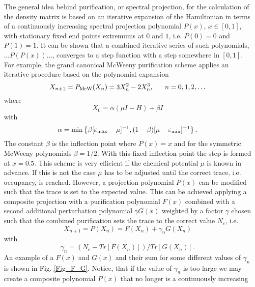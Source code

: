 The general idea behind purification, or spectral projection, for the calculation
of the density matrix is based on an iterative expansion of the
Hamiltonian in terms of a continuously increasing spectral projection 
polynomial $P(x)$, $x \in [0,1]$,
with stationary fixed end points extremums at $0$ and $1$, 
i.e. $P(0) = 0$ and $P(1) = 1$. 
It can be shown that a combined iterative series of such polynomials, 
$\ldots P(P(x)) \ldots$,  
converges to a step function with a step somewhere in $[0,1]$. 
For example, the grand canonical McWeeny purification scheme \cite{McWeeny60,Palser98}
applies an iterative procedure based on the polynomial expansion
\begin{equation} \label{P3}
X_{n+1} = P_{\rm McW}(X_n) = 3 X_n^2 - 2 X_n^3, ~~~~~ n = 0,1,2, \ldots
\end{equation}
where
\begin{equation} \label{Pur2}
X_0 = \alpha(\mu { I} - { H}) + \beta{ I}
\end{equation}
with
\begin{equation} \label{StartG}
\alpha = {\rm min} \left\{ \beta[\varepsilon_{\rm max} - \mu]^{-1},
(1-\beta)[\mu - \varepsilon_{\rm min}]^{-1} \right\}.
\end{equation}
The constant $\beta$ is the inflection point where $P(x) = x$ and for 
the symmetric McWeeny polynomials $\beta = 1/2$. With this fixed
inflection point the step is formed at $x=0.5$. This scheme is very
efficient if the chemical potential $\mu$ is known in advance. If this
is not the case $\mu$ has to be adjusted until the correct trace, i.e. occupancy, 
is reached. However, a projection polynomial $P(x)$ can be modified
such that the trace is set to the expected value. This can be achieved
applying a composite projection with a purification polynomial $F(x)$ 
combined with a second additional perturbation polynomial $\gamma G(x)$ 
weighted by a factor $\gamma$ chosen such that the combined purification sets 
the trace to the correct value $N_e$, i.e.
\begin{equation} \label{NT}
X_{n+1} = P(X_n) = F(X_n) + \gamma_n G(X_n)
\end{equation}
with \begin{equation} \label{gamma}
\gamma_n = (N_e - Tr[F(X_n)])/Tr[G(X_n)].
\end{equation}
An example of a $F(x)$ and $G(x)$ and their sum for some
different values of $\gamma_n$ is shown in Fig. \ref{Fig_F_G}.
Notice, that if the value of $\gamma_n$ is too large we may create
a composite polynomial $P(x)$ that no longer is a continuously  increasing
